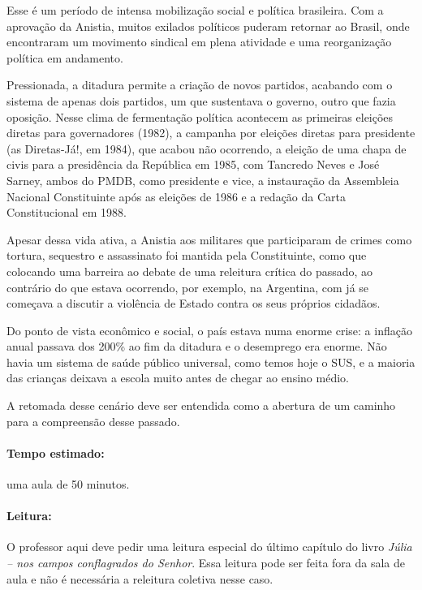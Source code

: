 \documentclass[12pt]{extarticle}
\begin{document}
Esse é um período de intensa mobilização social e política brasileira.
Com a aprovação da Anistia, muitos exilados políticos puderam retornar
ao Brasil, onde encontraram um movimento sindical em plena atividade e
uma reorganização política em andamento.

Pressionada, a ditadura permite a criação de novos partidos, acabando
com o sistema de apenas dois partidos, um que sustentava o governo,
outro que fazia oposição. Nesse clima de fermentação política acontecem
as primeiras eleições diretas para governadores (1982), a campanha por
eleições diretas para presidente (as Diretas-Já!, em 1984), que acabou
não ocorrendo, a eleição de uma chapa de civis para a presidência da
República em 1985, com Tancredo Neves e José Sarney, ambos do PMDB, como
presidente e vice, a instauração da Assembleia Nacional Constituinte
após as eleições de 1986 e a redação da Carta Constitucional em 1988.



Apesar dessa vida ativa, a Anistia aos militares que participaram de
crimes como tortura, sequestro e assassinato foi mantida pela
Constituinte, como que colocando uma barreira ao debate de uma releitura
crítica do passado, ao contrário do que estava ocorrendo, por exemplo,
na Argentina, com já se começava a discutir a violência de Estado contra
os seus próprios cidadãos.



Do ponto de vista econômico e social, o país estava numa enorme crise: a
inflação anual passava dos 200\% ao fim da ditadura e o desemprego era
enorme. Não havia um sistema de saúde público universal, como temos hoje
o SUS, e a maioria das crianças deixava a escola muito antes de chegar
ao ensino médio.

A retomada desse cenário deve ser entendida como a abertura de um
caminho para a compreensão desse passado.

\paragraph{Tempo estimado:} uma aula de 50 minutos.

\paragraph{Leitura:}

O professor aqui deve pedir uma leitura especial do último capítulo do
livro \emph{Júlia -- nos campos conflagrados do Senhor}. Essa leitura
pode ser feita fora da sala de aula e não é necessária a releitura
coletiva nesse caso.
\end{document}
